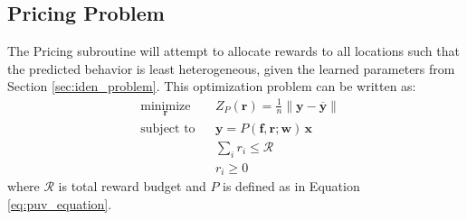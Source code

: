\documentclass[12pt]{article}
\newcommand{\vect}[1]{\mathbf{#1}}
\newcommand{\matr}[1]{\mathbf{#1}}
\newcommand{\mean}[1]{\overline{#1}}
\begin{document}
    \subsection{Pricing Problem} \label{sec:pricing_problem}
    The Pricing subroutine will attempt to allocate rewards to all locations such that the predicted behavior is least heterogeneous, given the learned parameters from Section \ref{sec:iden_problem}. This optimization problem can be written as:
    \begin{equation} \label{eq:pricing_problem}
    \begin{aligned}
    & \underset{\vect{r}}{\text{minimize}}
    & & Z_P(\vect{r}) = \frac{1}{n}\lVert \vect{y} - \mean{\vect{y}} \rVert\\
    & \text{subject to}
    & & \vect{y} = P(\matr{f}, \vect{r}; \matr{w}) \, \vect{x}\\
    &&& \sum_{i} r_i \leq \mathcal{R}\\
    &&& r_i \geq 0
    \end{aligned}
    \end{equation}
    where $\mathcal{R}$ is total reward budget and $P$ is defined as in Equation \ref{eq:puv_equation}.
    
\end{document}
